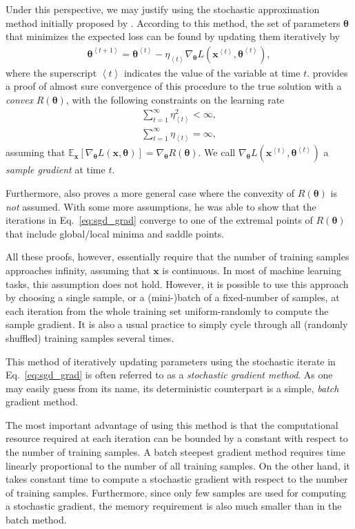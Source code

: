 \documentclass[dissertation,nocontribution,draft*]{aaltoseries}
\newcommand{\qexp}[1]{\left<#1\right>}
\newcommand{\vect}[1]{\mathbf{#1}}
\newcommand{\vects}[1]{\boldsymbol{#1}}
\newcommand{\vx}[0]{\vect{x}}
\newcommand{\TT}[0]{{\vects{\theta}}}
\newcommand{\E}[0]{\mathbb{E}}
\begin{document}
Under this perspective, we may justify using the stochastic
approximation method initially proposed by
\citet{Robbins1951}.  According to this method, the set of
parameters $\TT$ that minimizes the expected loss can be
found by updating them iteratively by
\begin{align}
    \label{eq:sgd_grad}
    \TT^{\qexp{t+1}} = \TT^{\qexp{t}} - \eta_{\qexp{t}}
    \nabla_{\TT} L(\vx^{\qexp{t}},
    \TT^{\qexp{t}}),
\end{align}
where the superscript $\qexp{t}$ indicates the value of the
variable at time $t$. \citet{Bottou1998} provides a proof of
almost sure convergence of this procedure to the true
solution with a \textit{convex} $R(\TT)$, with the following
constraints on the learning rate
\begin{align}
    \label{eq:sgd_lr_cond1}
    \sum_{t=1}^\infty \eta_{\qexp{t}}^2 < \infty, \\
    \label{eq:sgd_lr_cond2}
    \sum_{t=1}^\infty \eta_{\qexp{t}} = \infty,
\end{align}
assuming that $\E_\vx \left[ \nabla_{\TT} L(\vx, \TT) \right] =
\nabla_\TT R(\TT)$. We call $\nabla_{\TT} L(\vx^{\qexp{t}},
\TT^{\qexp{t}})$ a \textit{sample gradient} at time $t$.

Furthermore, \citet{Bottou1998} also proves a more general
case where the convexity of $R(\TT)$ is \textit{not}
assumed. With some more assumptions, he was able to show
that the iterations in Eq.~\eqref{eq:sgd_grad} converge to
one of the extremal points of $R(\TT)$ that include
global/local minima and saddle points.

All these proofs, however, essentially require that the
number of training samples approaches infinity, assuming
that $\vx$ is continuous. In most of machine learning tasks,
this assumption does not hold. However, it is possible to
use this approach by choosing a single sample, or a (mini-)batch of
a fixed-number of samples, at each iteration from the whole
training set uniform-randomly to compute the sample
gradient. It is also a usual practice to simply cycle
through all (randomly shuffled) training samples several
times.

This method of iteratively updating parameters using the
stochastic iterate in Eq.~\eqref{eq:sgd_grad} is often
referred to as a \textit{stochastic gradient method}. As one
may easily guess from its name, its deterministic
counterpart is a simple, \textit{batch} gradient method.

The most important advantage of using this method is that
the computational resource required at each iteration can be
bounded by a constant with respect to the number of training
samples. A batch steepest gradient method requires time
linearly proportional to the number of all training samples.
On the other hand, it takes constant time to compute a stochastic
gradient with respect to the
number of training samples. Furthermore, since only few samples are used for
computing a stochastic gradient, the memory requirement is
also much smaller than in the batch method.
\end{document}
